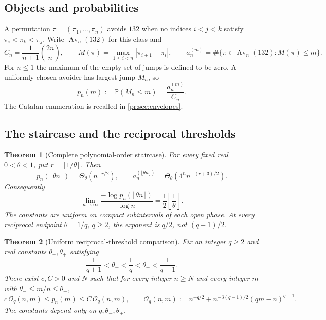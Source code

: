 \documentclass[11pt,a4paper]{article}
\newtheorem{theorem}{Theorem}[section]
\theoremstyle{definition}\newaliascnt{definition}{theorem}
\theoremstyle{remark}\newaliascnt{remark}{theorem}
\newcommand{\Av}{\operatorname{Av}}
\newcommand{\ljP}{\mathbb P}
\newcommand{\prpos}[1]{(#1)_+}
\begin{document}
\subsection{Objects and probabilities}
A permutation $\pi=(\pi_1,\ldots,\pi_n)$ avoids $132$ when no indices
$i<j<k$ satisfy $\pi_i<\pi_k<\pi_j$. Write $\Av_n(132)$ for this class and
\begin{equation}
 C_n=\frac{1}{n+1}\binom{2n}{n},\qquad
 M(\pi)=\max_{1\le i<n}|\pi_{i+1}-\pi_i|,
 \qquad
 a_n^{(m)}=\#\{\pi\in\Av_n(132):M(\pi)\le m\}.
 \label{pr:eq:objects}
\end{equation}
For $n\le1$ the maximum of the empty set of jumps is defined to be zero. A
uniformly chosen avoider has largest jump $M_n$, so
\begin{equation}
 p_n(m):=\ljP(M_n\le m)=\frac{a_n^{(m)}}{C_n}.
 \label{pr:eq:prob}
\end{equation}
The Catalan enumeration is recalled in \cref{pr:sec:envelopes}.

\subsection{The staircase and the reciprocal thresholds}
\begin{theorem}[Complete polynomial-order staircase]\label{pr:thm:staircase}
For every fixed real $0<\theta<1$, put $r=\lfloor1/\theta\rfloor$. Then
\begin{equation}
 p_n(\lfloor\theta n\rfloor)=\Theta_\theta(n^{-r/2}),
 \qquad
 a_n^{(\lfloor\theta n\rfloor)}
 =\Theta_\theta\!\left(4^n n^{-(r+3)/2}\right).
 \label{pr:eq:staircase}
\end{equation}
Consequently
\begin{equation}
 \lim_{n\to\infty}\frac{-\log p_n(\lfloor\theta n\rfloor)}{\log n}
 =\frac12\left\lfloor\frac1\theta\right\rfloor.
 \label{pr:eq:lograte}
\end{equation}
The constants are uniform on compact subintervals of each open phase. At
every reciprocal endpoint $\theta=1/q$, $q\ge2$, the exponent is $q/2$, not
$(q-1)/2$.
\end{theorem}

\begin{theorem}[Uniform reciprocal-threshold comparison]\label{pr:thm:cross}
Fix an integer $q\ge2$ and real constants $\theta_-,\theta_+$ satisfying
\begin{equation}
 \frac1{q+1}<\theta_-<\frac1q<\theta_+<\frac1{q-1}.
 \label{pr:eq:ab}
\end{equation}
There exist $c,C>0$ and $N$ such that for every integer $n\ge N$ and every
integer $m$ with $\theta_-\le m/n\le\theta_+$,
\begin{equation}
 c\,\mathcal O_q(n,m)\le p_n(m)\le C\,\mathcal O_q(n,m),
 \qquad
 \mathcal O_q(n,m):=n^{-q/2}
       +n^{-3(q-1)/2}\prpos{qm-n}^{q-1}.
 \label{pr:eq:cross}
\end{equation}
The constants depend only on $q,\theta_-,\theta_+$.
\end{theorem}
\end{document}

